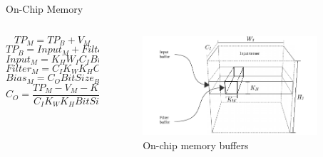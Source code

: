 \begin{frame}{On-Chip Memory}
	\begin{columns}[c] %
		\begin{column}{0.5\textwidth}

			\vspace{1mm}
			\begin{equation}
			TP_{M}=TP_B+V_{M}
			\end{equation}
			\vspace{1mm} 
			\begin{equation}
			TP_{B}=Input_{M}+Filter_{M}+Bias_{M}
			\end{equation}
			\vspace{1mm} 
			\begin{equation}
			Input_{M}=K_{H}W_{I}C_{I}BitSize_{I}
			\end{equation}
			\vspace{1mm} 
			\begin{equation}
			Filter_{M}=C_{I}K_{W}K_{H}C_{O}BitSize_{F}
			\end{equation}
			\vspace{1mm} 
			\begin{equation}
			Bias_{M}=C_{O}BitSize_{B}
			\end{equation}
			\vspace{1mm} 
			\begin{equation}
			C_{O}=\frac{TP_{M}-V_{M}-K_{H}W_{I}C_{I}BitSize_{I}}{C_{I}K_{W}K_{H}BitSize_{F}+BitSize_{B}}
			\end{equation}
		\end{column}
		
		\begin{column}{0.5\textwidth}
			\begin{figure}
				\centering
				\includegraphics[width=0.9\textwidth]{../chapters/cnn_accelerator/figures/accelerator_buffers.pdf} %
				\caption{ On-chip memory buffers}
			\end{figure}
		\end{column}
	\end{columns}
\end{frame}


